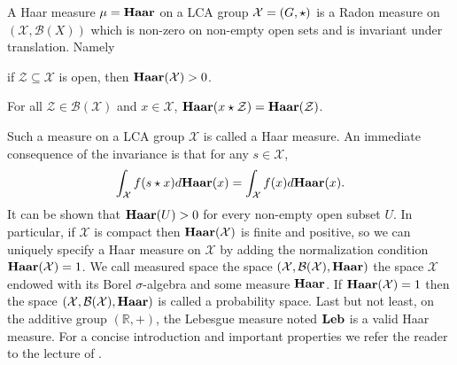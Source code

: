 \begin{definition}
    A Haar measure $\mu=\mathbf{Haar}$ on a \ac{LCA} group $\mathcal{X}=(G,\star)$
    is a Radon measure on $(\mathcal{X},\mathcal{B}(X))$ which is non-zero on
    non-empty open sets and is invariant under translation. Namely
    \begin{propenum}
        \item if $\mathcal{Z} \subseteq \mathcal{X}$ is open, then
        $\mathbf{Haar}(\mathcal{X})>0$.
        \item For all $\mathcal{Z}\in\mathcal{B}(\mathcal{X})$ and $x \in
        \mathcal{X}$, $\mathbf{Haar}(x\star \mathcal{Z})=\mathbf{Haar}(\mathcal{Z})$.
    \end{propenum}
\end{definition}
Such a measure on a \ac{LCA} group $\mathcal{X}$ is called a Haar
measure. An immediate
consequence of the invariance is that for any $s\in\mathcal{X}$,
\begin{dmath*}
    \int_{\mathcal{X}}f(s\groupop x)d\Haar(x)=\int_{\mathcal{X}}f(x)d\Haar(x).
\end{dmath*}
It can be shown that $\mathbf{Haar}(U) > 0$ for every non-empty open subset $U$. In
particular, if $\mathcal{X}$ is compact then $\mathbf{Haar}(\mathcal{X})$ is finite and
positive, so we can uniquely specify a Haar measure on $\mathcal{X}$ by adding
the normalization condition $\mathbf{Haar}(\mathcal{X})=1$. We call measured space the
space $(\mathcal{X},\mathcal{B}(\mathcal{X}),\mathbf{Haar})$ the space $\mathcal{X}$
endowed with its Borel $\sigma$-algebra and some measure $\mathbf{Haar}$. If
$\mathbf{Haar}(\mathcal{X})=1$ then the space
$(\mathcal{X},\mathcal{B}(\mathcal{X}),\mathbf{Haar})$ is called a probability space.
Last but not least, on the additive group $(\mathbb{R},+)$, the Lebesgue
measure noted $\mathbf{Leb}$ is a valid Haar measure. For a concise introduction and
important properties we refer the reader to the lecture of
\citet{tornier2014haar}.

